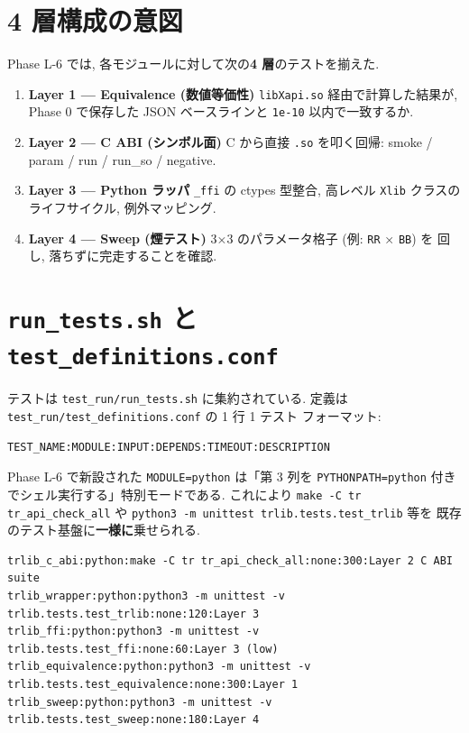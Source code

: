 \documentclass[11pt,a4paper]{report}
\begin{document}
\section{4 層構成の意図}

Phase L-6 では, 各モジュールに対して次の\textbf{4 層}のテストを揃えた.

\begin{enumerate}[leftmargin=1.5em]
  \item \textbf{Layer 1 — Equivalence (数値等価性)}
        \texttt{libXapi.so} 経由で計算した結果が, Phase 0 で保存した
        JSON ベースラインと \texttt{1e-10} 以内で一致するか.
  \item \textbf{Layer 2 — C ABI (シンボル面)}
        C から直接 \texttt{.so} を叩く回帰: smoke / param / run /
        run\_so / negative.
  \item \textbf{Layer 3 — Python ラッパ}
        \texttt{\_ffi} の ctypes 型整合, 高レベル \texttt{Xlib} クラスの
        ライフサイクル, 例外マッピング.
  \item \textbf{Layer 4 — Sweep (煙テスト)}
        3×3 のパラメータ格子 (例: \texttt{RR} × \texttt{BB}) を
        回し, 落ちずに完走することを確認.
\end{enumerate}

\section{\texttt{run\_tests.sh} と \texttt{test\_definitions.conf}}

テストは \texttt{test\_run/run\_tests.sh} に集約されている.
定義は \texttt{test\_run/test\_definitions.conf} の 1 行 1 テスト
フォーマット:

\begin{lstlisting}[style=plain]
TEST_NAME:MODULE:INPUT:DEPENDS:TIMEOUT:DESCRIPTION
\end{lstlisting}

Phase L-6 で新設された \texttt{MODULE=python} は「第 3 列を
\texttt{PYTHONPATH=python} 付きでシェル実行する」特別モードである.
これにより \texttt{make -C tr tr\_api\_check\_all} や
\texttt{python3 -m unittest trlib.tests.test\_trlib} 等を
既存のテスト基盤に\textbf{一様に}乗せられる.

\begin{lstlisting}[style=plain,caption={抜粋: trlib の 5 層登録}]
trlib_c_abi:python:make -C tr tr_api_check_all:none:300:Layer 2 C ABI suite
trlib_wrapper:python:python3 -m unittest -v trlib.tests.test_trlib:none:120:Layer 3
trlib_ffi:python:python3 -m unittest -v trlib.tests.test_ffi:none:60:Layer 3 (low)
trlib_equivalence:python:python3 -m unittest -v trlib.tests.test_equivalence:none:300:Layer 1
trlib_sweep:python:python3 -m unittest -v trlib.tests.test_sweep:none:180:Layer 4
\end{lstlisting}
\end{document}
